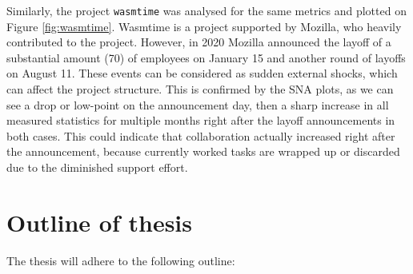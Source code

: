 Similarly, the project \texttt{wasmtime} was analysed for the same metrics and plotted on Figure \ref{fig:wasmtime}. Wasmtime is a project supported by Mozilla, who heavily contributed to the project. However, in 2020 Mozilla announced the layoff of a substantial amount (70) of employees on January 15 and another round of layoffs on August 11. These events can be considered as sudden external shocks, which can affect the project structure. This is confirmed by the SNA plots, as we can see a drop or low-point on the announcement day, then a sharp increase in all measured statistics for multiple months right after the layoff announcements in both cases. This could indicate that collaboration actually increased right after the announcement, because currently worked tasks are wrapped up or discarded due to the diminished support effort. \\




\section{Outline of thesis}

The thesis will adhere to the following outline:

